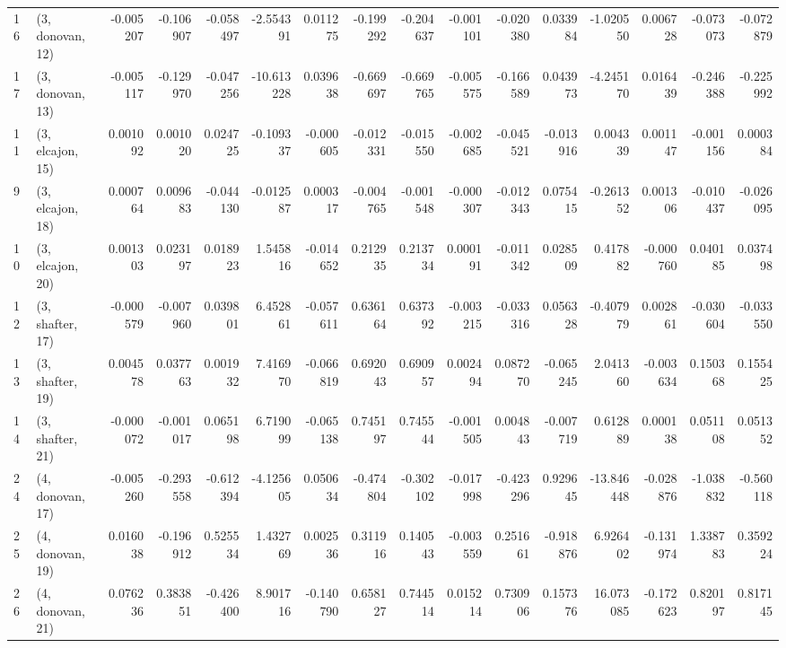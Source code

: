 \begin{tabular}{llrrrrrrrrrrrrrr}
16 &  (3, donovan, 12) &  -0.005207 & -0.106907 & -0.058497 &  -2.554391 &  0.011275 &  -0.199292 & -0.204637 & -0.001101 & -0.020380 &  0.033984 &  -1.020550 &  0.006728 & -0.073073 & -0.072879 \\
17 &  (3, donovan, 13) &  -0.005117 & -0.129970 & -0.047256 & -10.613228 &  0.039638 &  -0.669697 & -0.669765 & -0.005575 & -0.166589 &  0.043973 &  -4.245170 &  0.016439 & -0.246388 & -0.225992 \\
11 &  (3, elcajon, 15) &   0.001092 &  0.001020 &  0.024725 &  -0.109337 & -0.000605 &  -0.012331 & -0.015550 & -0.002685 & -0.045521 & -0.013916 &   0.004339 &  0.001147 & -0.001156 &  0.000384 \\
9  &  (3, elcajon, 18) &   0.000764 &  0.009683 & -0.044130 &  -0.012587 &  0.000317 &  -0.004765 & -0.001548 & -0.000307 & -0.012343 &  0.075415 &  -0.261352 &  0.001306 & -0.010437 & -0.026095 \\
10 &  (3, elcajon, 20) &   0.001303 &  0.023197 &  0.018923 &   1.545816 & -0.014652 &   0.212935 &  0.213734 &  0.000191 & -0.011342 &  0.028509 &   0.417882 & -0.000760 &  0.040185 &  0.037498 \\
12 &  (3, shafter, 17) &  -0.000579 & -0.007960 &  0.039801 &   6.452861 & -0.057611 &   0.636164 &  0.637392 & -0.003215 & -0.033316 &  0.056328 &  -0.407979 &  0.002861 & -0.030604 & -0.033550 \\
13 &  (3, shafter, 19) &   0.004578 &  0.037763 &  0.001932 &   7.416970 & -0.066819 &   0.692043 &  0.690957 &  0.002494 &  0.087270 & -0.065245 &   2.041360 & -0.003634 &  0.150368 &  0.155425 \\
14 &  (3, shafter, 21) &  -0.000072 & -0.001017 &  0.065198 &   6.719099 & -0.065138 &   0.745197 &  0.745544 & -0.001505 &  0.004843 & -0.007719 &   0.612889 &  0.000138 &  0.051108 &  0.051352 \\
24 &  (4, donovan, 17) &  -0.005260 & -0.293558 & -0.612394 &  -4.125605 &  0.050634 &  -0.474804 & -0.302102 & -0.017998 & -0.423296 &  0.929645 & -13.846448 & -0.028876 & -1.038832 & -0.560118 \\
25 &  (4, donovan, 19) &   0.016038 & -0.196912 &  0.525534 &   1.432769 &  0.002536 &   0.311916 &  0.140543 & -0.003559 &  0.251661 & -0.918876 &   6.926402 & -0.131974 &  1.338783 &  0.359224 \\
26 &  (4, donovan, 21) &   0.076236 &  0.383851 & -0.426400 &   8.901716 & -0.140790 &   0.658127 &  0.744514 &  0.015214 &  0.730906 &  0.157376 &  16.073085 & -0.172623 &  0.820197 &  0.817145 \\

\end{tabular}
